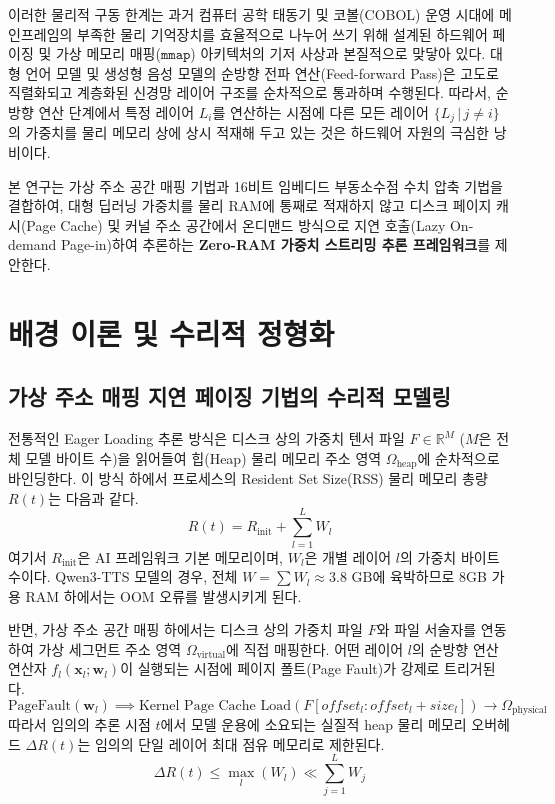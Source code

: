 \documentclass[twocolumn]{article}
\begin{document}
이러한 물리적 구동 한계는 과거 컴퓨터 공학 태동기 및 코볼(COBOL) 운영 시대에 메인프레임의 부족한 물리 기억장치를 효율적으로 나누어 쓰기 위해 설계된 하드웨어 페이징 및 가상 메모리 매핑($\mathtt{mmap}$) 아키텍처의 기저 사상과 본질적으로 맞닿아 있다. 대형 언어 모델 및 생성형 음성 모델의 순방향 전파 연산(Feed-forward Pass)은 고도로 직렬화되고 계층화된 신경망 레이어 구조를 순차적으로 통과하며 수행된다. 따라서, 순방향 연산 단계에서 특정 레이어 $L_i$를 연산하는 시점에 다른 모든 레이어 $\{L_j \,|\, j \neq i\}$의 가중치를 물리 메모리 상에 상시 적재해 두고 있는 것은 하드웨어 자원의 극심한 낭비이다.

본 연구는 가상 주소 공간 매핑 기법과 16비트 임베디드 부동소수점 수치 압축 기법을 결합하여, 대형 딥러닝 가중치를 물리 RAM에 통째로 적재하지 않고 디스크 페이지 캐시(Page Cache) 및 커널 주소 공간에서 온디맨드 방식으로 지연 호출(Lazy On-demand Page-in)하여 추론하는 \textbf{Zero-RAM 가중치 스트리밍 추론 프레임워크}를 제안한다.

\section{배경 이론 및 수리적 정형화}
\subsection{가상 주소 매핑 지연 페이징 기법의 수리적 모델링}
전통적인 Eager Loading 추론 방식은 디스크 상의 가중치 텐서 파일 $F \in \mathbb{R}^{M}$ ($M$은 전체 모델 바이트 수)을 읽어들여 힙(Heap) 물리 메모리 주소 영역 $\Omega_{\text{heap}}$에 순차적으로 바인딩한다. 이 방식 하에서 프로세스의 Resident Set Size(RSS) 물리 메모리 총량 $R(t)$는 다음과 같다.
\begin{equation}
R(t) = R_{\text{init}} + \sum_{l=1}^{L} W_{l}
\end{equation}
여기서 $R_{\text{init}}$은 AI 프레임워크 기본 메모리이며, $W_{l}$은 개별 레이어 $l$의 가중치 바이트 수이다. Qwen3-TTS 모델의 경우, 전체 $W = \sum W_l \approx 3.8 \text{ GB}$에 육박하므로 8GB 가용 RAM 하에서는 OOM 오류를 발생시키게 된다.

반면, 가상 주소 공간 매핑 하에서는 디스크 상의 가중치 파일 $F$와 파일 서술자를 연동하여 가상 세그먼트 주소 영역 $\Omega_{\text{virtual}}$에 직접 매핑한다. 어떤 레이어 $l$의 순방향 연산 연산자 $f_l(\mathbf{x}_l; \mathbf{w}_l)$이 실행되는 시점에 페이지 폴트(Page Fault)가 강제로 트리거된다.
\begin{equation}
\text{PageFault}(\mathbf{w}_l) \implies \text{Kernel Page Cache Load}(F[offset_l : offset_l + size_l]) \to \Omega_{\text{physical}}
\end{equation}
따라서 임의의 추론 시점 $t$에서 모델 운용에 소요되는 실질적 heap 물리 메모리 오버헤드 $\Delta R(t)$는 임의의 단일 레이어 최대 점유 메모리로 제한된다.
\begin{equation}
\Delta R(t) \le \max_{l} (W_l) \ll \sum_{j=1}^{L} W_j
\end{equation}
\end{document}
